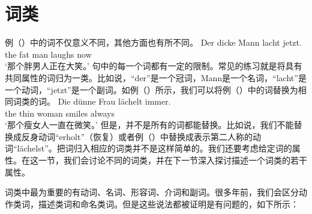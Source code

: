 \section{词类}
\label{Abschnitt-Wortarten}
例（）中的词不仅意义不同，其他方面也有所不同。
\ea
\gll Der dicke Mann lacht jetzt.\\
	 the fat man laughs now\\
\glt `那个胖男人正在大笑。'
\z
句中的每一个词都有一定的限制。常见的练习就是将具有共同属性的词归为一类。比如说，“der”是一个冠词，Mann是一个名词，“lacht”是一个动词，“jetzt”是一个副词。如例（）所示，我们可以将例（）中的词替换为相同词类的词。
\ea
\gll Die dünne Frau lächelt immer.\\
	 the thin woman smiles always\\
\glt `那个瘦女人一直在微笑。'
\z
但是，并不是所有的词都能替换。比如说，我们不能替换成反身动词“erholt”（恢复）或者例（）中替换成表示第二人称的动词“lächelst”。把词归入相应的词类并不是这样简单的。我们还要考虑给定词的属性。在这一节，我们会讨论不同的词类，并在下一节深入探讨描述一个词类的若干属性。

词类中最为重要的有动词、名词、形容词、介词和副词。很多年前，我们会区分动作类词，描述类词和命名类词。但是这些说法都被证明是有问题的，如下所示：

